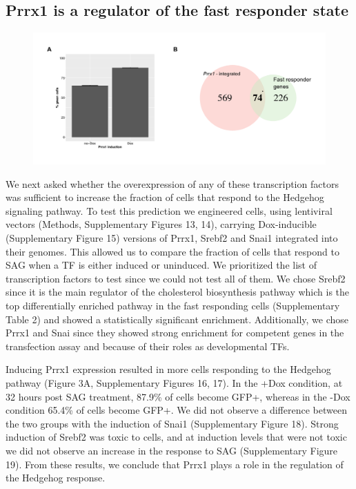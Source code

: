 \subsection{Prrx1 is a regulator of the fast responder state}
\begin{figure}[t!]  
    \centering
    \includegraphics[width=\linewidth]{figures/hedgehog/hh_figure3.pdf}
    \caption[]{%
        \textbf{}
    }
    \label{fig:hh_figure3}
\end{figure}
We next asked whether the overexpression of any of these transcription factors was sufficient to increase the fraction of cells that respond to the Hedgehog signaling pathway. To test this prediction we engineered cells, using lentiviral vectors (Methods, Supplementary Figures 13, 14), carrying Dox-inducible (Supplementary Figure 15) versions of Prrx1, Srebf2 and Snai1 integrated into their genomes. This allowed us to compare the fraction of cells that respond to SAG when a TF is either induced or uninduced. We prioritized the list of transcription factors to test since we could not test all of them. We chose Srebf2 since it is the main regulator of the cholesterol biosynthesis pathway which is the top differentially enriched pathway in the fast responding cells (Supplementary Table 2) and showed a statistically significant enrichment. Additionally, we chose Prrx1 and Snai since they showed strong enrichment for competent genes in the transfection assay and because of their roles as developmental TFs.

Inducing Prrx1 expression resulted in more cells responding to the Hedgehog pathway (Figure 3A, Supplementary Figures 16, 17). In the +Dox condition, at 32 hours post SAG treatment, 87.9\% of cells become GFP+, whereas in the -Dox condition 65.4\% of cells become GFP+. We did not observe a difference between the two groups with the induction of Snai1 (Supplementary Figure 18). Strong induction of Srebf2 was toxic to cells, and at induction levels that were not toxic we did not observe an increase in the response to SAG  (Supplementary Figure 19). From these results, we conclude that Prrx1 plays a role in the regulation of the Hedgehog response.

